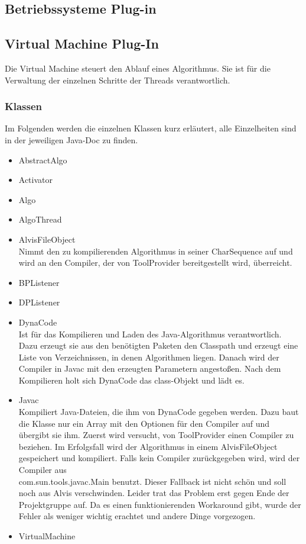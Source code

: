 \documentclass[10pt,a4paper,oneside]{scrbook}
\begin{document}
\subsection{Betriebssysteme Plug-in}







\subsection{Virtual Machine Plug-In}
Die Virtual Machine steuert den Ablauf eines Algorithmus. Sie ist für die Verwaltung der einzelnen
Schritte der Threads verantwortlich.

\subsubsection{Klassen}
Im Folgenden werden die einzelnen Klassen kurz erläutert, alle Einzelheiten sind in der jeweiligen Java-Doc zu finden.
\begin{itemize}
 \item AbstractAlgo\\
 \item Activator\\
 \item Algo\\
 \item AlgoThread\\
 \item AlvisFileObject\\
    Nimmt den zu kompilierenden Algorithmus in seiner CharSequence auf und wird an den Compiler, der von ToolProvider
    bereitgestellt wird, überreicht.
 \item BPListener\\
 \item DPListener\\
 \item DynaCode\\
    Ist für das Kompilieren und Laden des Java-Algorithmus verantwortlich.
    Dazu erzeugt sie aus den benötigten Paketen den Classpath und erzeugt eine Liste von Verzeichnissen, in denen
    Algorithmen liegen. Danach wird der Compiler in Javac mit den erzeugten Parametern angestoßen. Nach dem Kompilieren
    holt sich DynaCode das class-Objekt und lädt es.
 \item Javac\\
    Kompiliert Java-Dateien, die ihm von DynaCode gegeben werden. Dazu baut die Klasse nur ein Array mit den
    Optionen für den Compiler auf und übergibt sie ihm. Zuerst wird versucht, von ToolProvider einen Compiler zu
    beziehen. Im Erfolgsfall wird der Algorithmus in einem AlvisFileObject gespeichert und kompiliert.
    Falls kein Compiler zurückgegeben wird, wird der Compiler aus\\com.sun.tools.javac.Main benutzt.
    Dieser Fallback ist nicht schön und soll noch aus Alvis verschwinden. Leider trat das Problem erst gegen Ende der
    Projektgruppe auf. Da es einen funktionierenden Workaround gibt, wurde der Fehler als weniger wichtig erachtet und
    andere Dinge vorgezogen.
 \item VirtualMachine \\
\end{itemize}
\end{document}
